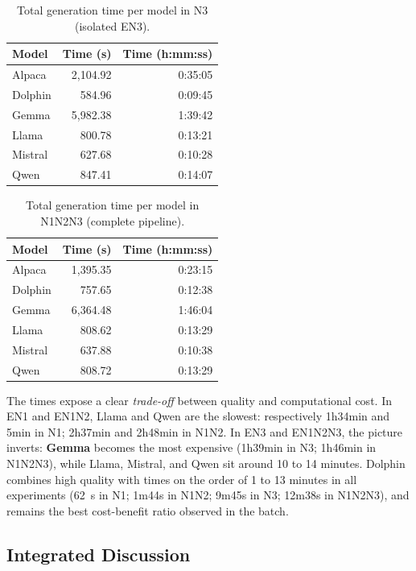 \documentclass[a4paper,fleqn]{cas-sc}
\newcommand{\melhor}[1]{\textcolor{green!55!black}{#1}}
\newcommand{\pior}[1]{\textcolor{red!80!black}{#1}}
\begin{document}
\begin{table}[ht]
\centering
\caption{Total generation time per model in N3 (isolated EN3).}
\label{tab:tempo_n3}
\begin{tabular}{lrr}
\hline
Model & Time (s) & Time (h:mm:ss) \\
\hline
Alpaca  & 2,104.92 & 0:35:05 \\
Dolphin & \melhor{584.96} & \melhor{0:09:45} \\
Gemma   & \pior{5,982.38} & \pior{1:39:42} \\
Llama   & 800.78 & 0:13:21 \\
Mistral & 627.68 & 0:10:28 \\
Qwen    & 847.41 & 0:14:07 \\
\hline
\end{tabular}
\end{table}

\begin{table}[ht]
\centering
\caption{Total generation time per model in N1N2N3 (complete pipeline).}
\label{tab:tempo_n1n2n3}
\begin{tabular}{lrr}
\hline
Model & Time (s) & Time (h:mm:ss) \\
\hline
Alpaca  & 1,395.35 & 0:23:15 \\
Dolphin & 757.65 & 0:12:38 \\
Gemma   & \pior{6,364.48} & \pior{1:46:04} \\
Llama   & 808.62 & 0:13:29 \\
Mistral & \melhor{637.88} & \melhor{0:10:38} \\
Qwen    & 808.72 & 0:13:29 \\
\hline
\end{tabular}
\end{table}

The times expose a clear \textit{trade-off} between quality and computational cost. In EN1 and EN1N2, Llama and Qwen are the slowest: respectively 1h34min and 5min in N1; 2h37min and 2h48min in N1N2. In EN3 and EN1N2N3, the picture inverts: \textbf{Gemma} becomes the most expensive (1h39min in N3; 1h46min in N1N2N3), while Llama, Mistral, and Qwen sit around 10 to 14 minutes. Dolphin combines high quality with times on the order of 1 to 13 minutes in all experiments (62~s in N1; 1m44s in N1N2; 9m45s in N3; 12m38s in N1N2N3), and remains the best cost-benefit ratio observed in the batch.

\subsection{Integrated Discussion}
\end{document}
